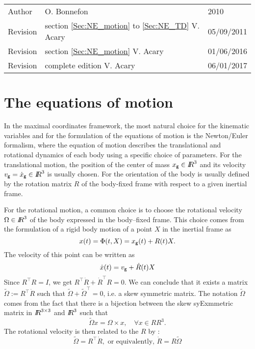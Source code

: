


\begin{tabular}{lll}
  \centering
  Author &  O. Bonnefon &2010\\
  Revision& section \ref{Sec:NE_motion} to \ref{Sec:NE_TD} V. Acary&  05/09/2011\\
  Revision& section \ref{Sec:NE_motion}  V. Acary&  01/06/2016\\
  Revision& complete edition V. Acary&  06/01/2017\\

\end{tabular}

\def\glaw{\cdot}
\section{The equations of motion}


\def\cg{\sf \small g}
In the maximal coordinates framework, the most natural choice for the kinematic  variables and for the formulation of the equations of motion is the Newton/Euler formalism, where the equation of motion describes the translational and rotational dynamics of each body using a specific choice of parameters. For the translational motion, the position of the center of mass $x_{\cg}\in \RR^3$ and its velocity  $v_{\cg} = \dot x_{\cg} \in \RR^3$ is usually chosen. For the orientation of the body is usually defined by the rotation matrix $R$ of the body-fixed frame with respect to a given inertial frame.

For the rotational motion, a common choice is to choose the rotational velocity  $\Omega \in \mbox{\rm $I\!\!R$}^3$ of the body expressed in the body--fixed frame. This choice comes from the formulation of a rigid body motion of a point $X$ in the inertial frame as
\begin{equation}
  \label{eq:1}
  x(t) = \Phi(t,X) = x_{\cg}(t) + R(t) X.
\end{equation}
The velocity of this point can be written as
\begin{equation}
  \label{eq:2}
  \dot x(t) = v_{\cg} + \dot R(t) X
\end{equation}
Since $R^\top R=I$, we get $R^\top \dot R + \dot R^\top R =0$. We can conclude that it exists a matrix $\tilde \Omega := R^\top \dot R $ such that $\tilde \Omega + \tilde \Omega^\top=0$, i.e. a skew symmetric matrix. The notation $\tilde \Omega$ comes from the fact that there is a bijection between the skew syExmmetric matrix in $\mbox{\rm $I\!\!R$}^{3\times3}$ and $\mbox{\rm $I\!\!R$}^3$ such that
\begin{equation}
  \label{eq:3}
  \tilde \Omega x  = \Omega \times x, \quad \forall x\in RR^3.
\end{equation}
The rotational velocity is then related to the $R$ by :
\begin{equation}
  \label{eq:angularvelocity}
  \widetilde \Omega = R^\top \dot R, \text { or equivalently, } \dot R  = R \widetilde \Omega
\end{equation}

